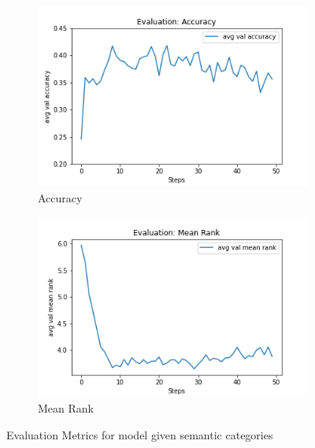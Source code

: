 
\begin{figure}[h]
     \centering
     \begin{subfigure}[b]{0.4\textwidth}
         \centering
         \includegraphics[width=\textwidth]{./figure/results/semantic_categories/eval/avg val accuracy.png}
         \caption{Accuracy}
         \label{fig:category_accuracy}
     \end{subfigure}
     \hfill
     \begin{subfigure}[b]{0.4\textwidth}
         \centering
         \includegraphics[width=\textwidth]{./figure/results/semantic_categories/eval/avg val mean rank.png}
         \caption{Mean Rank}
         \label{fig:category_mean_rank}
     \end{subfigure}
     \caption{Evaluation Metrics for model given semantic categories}
     \label{fig:category_metrics}
\end{figure}

